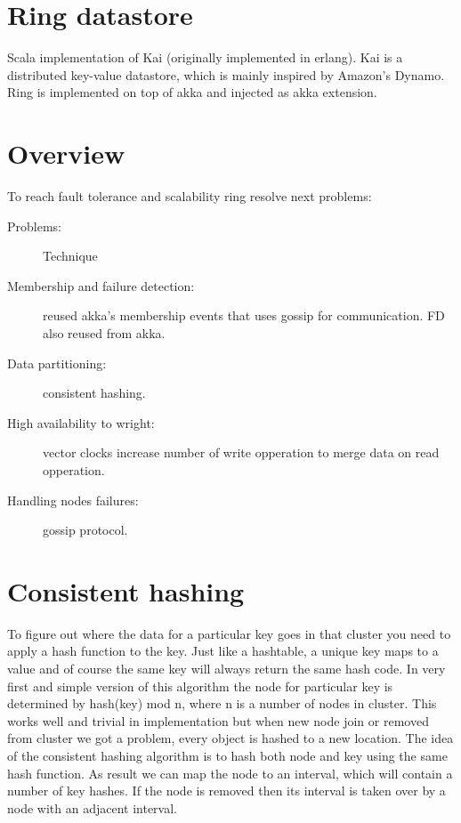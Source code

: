 \section{Ring datastore}

Scala implementation of Kai (originally implemented in erlang).
Kai is a distributed key-value datastore, which is mainly inspired
by Amazon's Dynamo. Ring is implemented on top of akka and injected as akka extension.

\section*{Overview}

To reach fault tolerance and scalability ring resolve next problems:

\begin{description}

          \item[Problems:]  Technique
          \item[Membership and failure detection: ]  reused akka's membership events that uses gossip for communication. FD also reused from akka.
          \item[Data partitioning:]   consistent hashing.
          \item[High availability to wright:]   vector clocks increase number of write opperation to merge data on read opperation.
          \item[Handling nodes failures:] gossip protocol.

\end{description}

\section*{Consistent hashing}

To figure out where the data for a particular key goes in that cluster you need to apply a hash function to the key.
Just like a hashtable, a unique key maps to a value and of course the same key will always return the same hash code.
In very first and simple version of this algorithm the node for particular key is determined by hash(key) mod n, where n is a number of
nodes in cluster. This works well and trivial in implementation but when new node join or removed from cluster we got a problem, every object is hashed to a new location.
The idea of the consistent hashing algorithm is to hash both node and key using the same hash function.
As result we can map the node to an interval, which will contain a number of key hashes. If the node is removed
then its interval is taken over by a node with an adjacent interval.

